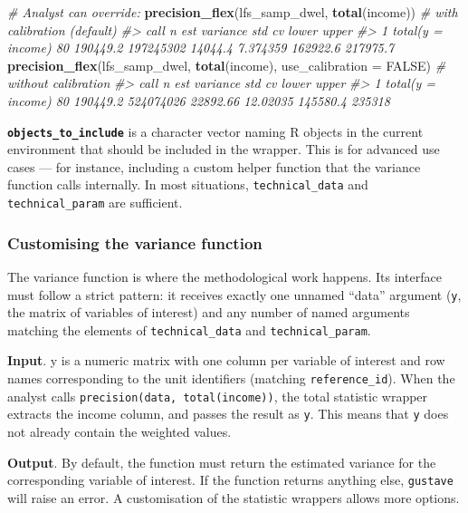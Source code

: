 \documentclass[
]{article}
\newenvironment{Shaded}{\begin{snugshade}}{\end{snugshade}}
\newcommand{\AttributeTok}[1]{\textcolor[rgb]{0.13,0.29,0.53}{#1}}
\newcommand{\CommentTok}[1]{\textcolor[rgb]{0.56,0.35,0.01}{\textit{#1}}}
\newcommand{\ConstantTok}[1]{\textcolor[rgb]{0.56,0.35,0.01}{#1}}
\newcommand{\FunctionTok}[1]{\textcolor[rgb]{0.13,0.29,0.53}{\textbf{#1}}}
\newcommand{\NormalTok}[1]{#1}
\begin{document}
\begin{Shaded}
\begin{Highlighting}[]
\CommentTok{\# Analyst can override:}
\FunctionTok{precision\_flex}\NormalTok{(lfs\_samp\_dwel, }\FunctionTok{total}\NormalTok{(income)) }\CommentTok{\# with calibration (default)}
\CommentTok{\#\textgreater{}                call  n      est  variance     std       cv    lower    upper}
\CommentTok{\#\textgreater{} 1 total(y = income) 80 190449.2 197245302 14044.4 7.374359 162922.6 217975.7}
\FunctionTok{precision\_flex}\NormalTok{(lfs\_samp\_dwel, }\FunctionTok{total}\NormalTok{(income), }\AttributeTok{use\_calibration =} \ConstantTok{FALSE}\NormalTok{) }\CommentTok{\# without calibration}
\CommentTok{\#\textgreater{}                call  n      est  variance      std       cv    lower  upper}
\CommentTok{\#\textgreater{} 1 total(y = income) 80 190449.2 524074026 22892.66 12.02035 145580.4 235318}
\end{Highlighting}
\end{Shaded}

\textbf{\texttt{objects\_to\_include}} is a character vector naming R
objects in the current environment that should be included in the
wrapper. This is for advanced use cases --- for instance, including a
custom helper function that the variance function calls internally. In
most situations, \texttt{technical\_data} and \texttt{technical\_param}
are sufficient.

\subsubsection{Customising the variance
function}\label{customising-the-variance-function}

The variance function is where the methodological work happens. Its
interface must follow a strict pattern: it receives exactly one unnamed
``data'' argument (\texttt{y}, the matrix of variables of interest) and
any number of named arguments matching the elements of
\texttt{technical\_data} and \texttt{technical\_param}.

\textbf{Input}. y is a numeric matrix with one column per variable of
interest and row names corresponding to the unit identifiers (matching
\texttt{reference\_id}). When the analyst calls
\texttt{precision(data,\ total(income))}, the total statistic wrapper
extracts the income column, and passes the result as \texttt{y}. This
means that \texttt{y} does not already contain the weighted values.

\textbf{Output}. By default, the function must return the estimated
variance for the corresponding variable of interest. If the function
returns anything else, \texttt{gustave} will raise an error. A
customisation of the statistic wrappers allows more options.
\end{document}
